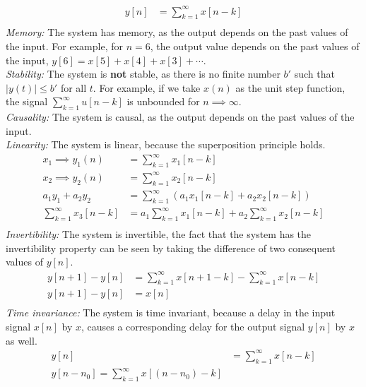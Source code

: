 \documentclass[10pt,a4paper, margin=1in]{article}
\begin{document}
\begin{enumerate}
\begin{enumerate}
        \begin{align*}
            y[n] & = \sum_{k = 1}^{\infty} x[n - k] \\
        \end{align*}
        \textit{Memory: } The system has memory, as the output depends on the past values of the input.
        For example, for $n = 6$, the output value depends on the past values of the input,
        $y[6] = x[5] + x[4] + x[3] + \cdots$.\\
        \textit{Stability: } The system is \textbf{not} stable, as there is no finite number $b'$ such that $|y(t)| \leq b'$ for all $t$.
        For example, if we take $x(n)$ as the unit step function, the signal $\sum_{k = 1}^{\infty} u[n - k]$ is unbounded for $n \implies \infty$.\\
        \textit{Causality: } The system is causal, as the output depends on the past values of the input.\\
        \textit{Linearity: } The system is linear, because the superposition principle holds.\\
        \begin{align*}
            x_1 \implies y_1(n) & = \sum_{k = 1}^{\infty} x_1[n - k] \\
            x_2 \implies y_2(n) & = \sum_{k = 1}^{\infty} x_2[n - k] \\
            a_1y_1 + a_2y_2 & = \sum_{k = 1}^{\infty} (a_1x_1[n - k] + a_2x_2[n - k])\\
            \sum_{k = 1}^{\infty} x_3[n - k] & = a_1\sum_{k = 1}^{\infty} x_1[n - k] + a_2\sum_{k = 1}^{\infty} x_2[n - k] \\ 
        \end{align*}
        \textit{Invertibility: } The system is invertible, the fact that the system has the invertibility property can be seen
        by taking the difference of two consequent values of $y[n]$.\\
        \begin{align*}
            y[n + 1] - y[n] & = \sum_{k = 1}^{\infty} x[n + 1 - k] - \sum_{k = 1}^{\infty} x[n - k]\\
            y[n + 1] - y[n] & = x[n]\\
        \end{align*}
        \textit{Time invariance: } The system is time invariant, because a delay in the input signal $x[n]$ by $x$, causes a
        corresponding delay for the output signal $y[n]$ by $x$ as well.\\
        \begin{align*}
            y[n] & = \sum_{k = 1}^{\infty} x[n - k] \\
            y[n- n_0] = \sum_{k = 1}^{\infty} x[(n - n_0) - k]\\
        \end{align*}
        \end{enumerate}
    

\end{enumerate}
\end{document}
